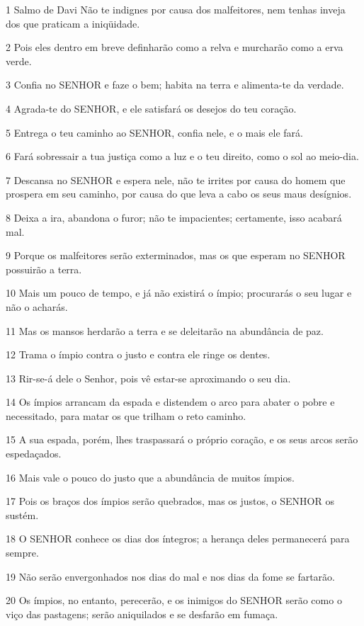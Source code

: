 \par 1 Salmo de Davi Não te indignes por causa dos malfeitores, nem tenhas inveja dos que praticam a iniqüidade.
\par 2 Pois eles dentro em breve definharão como a relva e murcharão como a erva verde.
\par 3 Confia no SENHOR e faze o bem; habita na terra e alimenta-te da verdade.
\par 4 Agrada-te do SENHOR, e ele satisfará os desejos do teu coração.
\par 5 Entrega o teu caminho ao SENHOR, confia nele, e o mais ele fará.
\par 6 Fará sobressair a tua justiça como a luz e o teu direito, como o sol ao meio-dia.
\par 7 Descansa no SENHOR e espera nele, não te irrites por causa do homem que prospera em seu caminho, por causa do que leva a cabo os seus maus desígnios.
\par 8 Deixa a ira, abandona o furor; não te impacientes; certamente, isso acabará mal.
\par 9 Porque os malfeitores serão exterminados, mas os que esperam no SENHOR possuirão a terra.
\par 10 Mais um pouco de tempo, e já não existirá o ímpio; procurarás o seu lugar e não o acharás.
\par 11 Mas os mansos herdarão a terra e se deleitarão na abundância de paz.
\par 12 Trama o ímpio contra o justo e contra ele ringe os dentes.
\par 13 Rir-se-á dele o Senhor, pois vê estar-se aproximando o seu dia.
\par 14 Os ímpios arrancam da espada e distendem o arco para abater o pobre e necessitado, para matar os que trilham o reto caminho.
\par 15 A sua espada, porém, lhes traspassará o próprio coração, e os seus arcos serão espedaçados.
\par 16 Mais vale o pouco do justo que a abundância de muitos ímpios.
\par 17 Pois os braços dos ímpios serão quebrados, mas os justos, o SENHOR os sustém.
\par 18 O SENHOR conhece os dias dos íntegros; a herança deles permanecerá para sempre.
\par 19 Não serão envergonhados nos dias do mal e nos dias da fome se fartarão.
\par 20 Os ímpios, no entanto, perecerão, e os inimigos do SENHOR serão como o viço das pastagens; serão aniquilados e se desfarão em fumaça.
